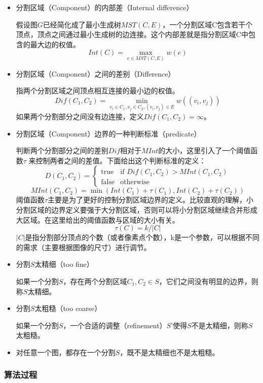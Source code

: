 \documentclass[a4paper, 12pt, UTF8]{article}
\begin{document}
\begin{itemize}

\item 分割区域（Component）的内部差（Internal difference）

假设图$G$已经简化成了最小生成树$MST(C, E)$，一个分割区域C包含若干个顶点，顶点之间通过最小生成树的边连接。这个内部差就是指分割区域C中包含的最大边的权值。
$$Int(C) = \max_{e \in MST(C, E)} w(e)$$

\item 分割区域（Component）之间的差别（Difference）

指两个分割区域之间顶点相互连接的最小边的权值。
$$Dif(C_1, C_2) = \min_{v_i \in C_1, v_j \in C_2, (v_i, v_j) \in E} w((v_i, v_j))$$
如果两个分割部分之间没有边连接，定义$Dif(C_1, C_2) = \infty$。

\item 分割区域（Component）边界的一种判断标准（predicate）

判断两个分割部分之间的差别$Dif$相对于$MInt$的大小，这里引入了一个阈值函数$\tau$ 来控制两者之间的差值。下面给出这个判断标准的定义：
$$D(C_1, C_2) = 
\begin{cases}
    \text{true}  & \text{if } Dif(C_1, C_2) > MInt(C_1, C_2) \\
    \text{false} & \text{otherwise}
\end{cases}$$
$$MInt(C_1, C_2) = \min(Int(C_1) + \tau(C_1), Int(C_2) + \tau(C_2))$$
阈值函数$\tau$主要是为了更好的控制分割区域边界的定义。比较直观的理解，小分割区域的边界定义要强于大分割区域，否则可以将小分割区域继续合并形成大区域。在这里给出的阈值函数与区域的大小有关。
$$\tau(C) = k / |C|$$
$|C|$是指分割部分顶点的个数（或者像素点个数），k是一个参数，可以根据不同的需求（主要根据图像的尺寸）进行调节。

\item 分割$S$太精细（too fine）

如果一个分割$S$，存在两个分割区域$C_1, C_2 \in S$，它们之间没有明显的边界，则称$S$太精细。

\item 分割$S$太粗糙（too coarse）

如果一个分割$S$，一个合适的调整（refinement）$S’$使得$S$不是太精细，则称$S$太粗糙。

\item 对任意一个图，都存在一个分割$S$，既不是太精细也不是太粗糙。

\end{itemize}

\subsubsection{算法过程}
\end{document}
